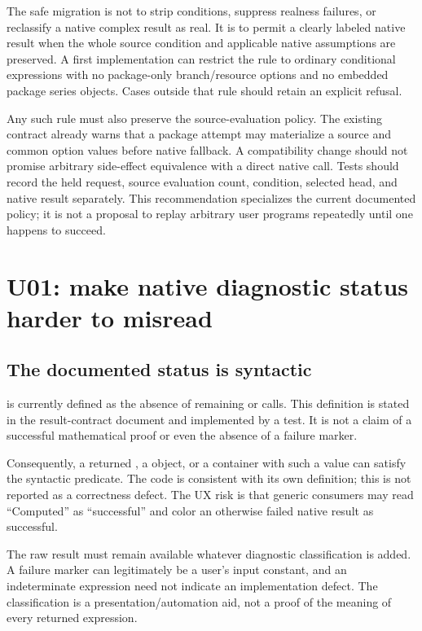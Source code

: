 \documentclass[11pt,letterpaper]{article}
\theoremstyle{definition}\newtheorem{definition}[proposition]{Definition}
\begin{document}
The safe migration is not to strip conditions, suppress realness failures, or
reclassify a native complex result as real. It is to permit a clearly labeled
native result when the whole source condition and applicable native assumptions
are preserved. A first implementation can restrict the rule to ordinary
conditional expressions with no package-only branch/resource options and no
embedded package series objects. Cases outside that rule should retain an
explicit refusal.

Any such rule must also preserve the source-evaluation policy. The existing
contract already warns that a package attempt may materialize a source and
common option values before native fallback. A compatibility change should
not promise arbitrary side-effect equivalence with a direct native call.
Tests should record the held request, source evaluation count, condition,
selected head, and native result separately. This recommendation specializes
the current documented policy; it is not a proposal to replay arbitrary user
programs repeatedly until one happens to succeed.\cite{contracts}

\section{U01: make native diagnostic status harder to misread}
\subsection{The documented status is syntactic}
 is currently defined as the absence
of remaining  or  calls. This definition is stated
in the result-contract document and implemented by a  test. It is
not a claim of a successful mathematical proof or even the absence of a failure
marker.\cite{native,contracts}

Consequently, a returned , a  object, or a container
with such a value can satisfy the syntactic predicate. The code is consistent
with its own definition; this is not reported as a correctness defect. The
UX risk is that generic consumers may read ``Computed'' as ``successful'' and
color an otherwise failed native result as successful.

The raw result must remain available whatever diagnostic classification is
added. A failure marker can legitimately be a user's input constant, and an
indeterminate expression need not indicate an implementation defect. The
classification is a presentation/automation aid, not a proof of the meaning
of every returned expression.
\end{document}
